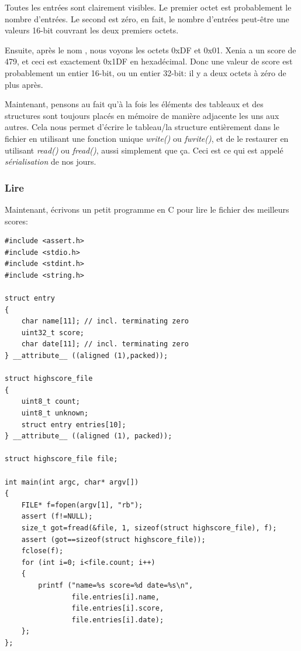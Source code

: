 Toutes les entrées sont clairement visibles.
Le premier octet est probablement le nombre d'entrées.
Le second est zéro, en fait, le nombre d'entrées peut-être une valeurs 16-bit couvrant
les deux premiers octets.

Ensuite, après le nom , nous voyons les octets 0xDF et 0x01.
Xenia a un score de 479, et ceci est exactement 0x1DF en hexadécimal.
Donc une valeur de score est probablement un entier 16-bit, ou un entier 32-bit:
il y a deux octets à zéro de plus après.

Maintenant, pensons au fait qu'à la fois les éléments des tableaux et des structures
sont toujours placés en mémoire de manière adjacente les uns aux autres.
Cela nous permet d'écrire le tableau/la structure entièrement dans le fichier en
utilisant une fonction unique \emph{write()} ou \emph{fwrite()}, et de le restaurer en
utilisant \emph{read()} ou \emph{fread()}, aussi simplement que ça.
Ceci est ce qui est appelé \emph{sérialisation} de nos jours.

\subsubsection{Lire}

Maintenant, écrivons un petit programme en C pour lire le fichier des meilleurs scores:

\begin{lstlisting}[style=customc]
#include <assert.h>
#include <stdio.h>
#include <stdint.h>
#include <string.h>

struct entry
{
	char name[11]; // incl. terminating zero
	uint32_t score;
	char date[11]; // incl. terminating zero
} __attribute__ ((aligned (1),packed));

struct highscore_file
{
	uint8_t count;
	uint8_t unknown;
	struct entry entries[10];
} __attribute__ ((aligned (1), packed));

struct highscore_file file;

int main(int argc, char* argv[])
{
	FILE* f=fopen(argv[1], "rb");
	assert (f!=NULL);
	size_t got=fread(&file, 1, sizeof(struct highscore_file), f);
	assert (got==sizeof(struct highscore_file));
	fclose(f);
	for (int i=0; i<file.count; i++)
	{
		printf ("name=%s score=%d date=%s\n",
				file.entries[i].name,
				file.entries[i].score,
				file.entries[i].date);
	};
};
\end{lstlisting}

